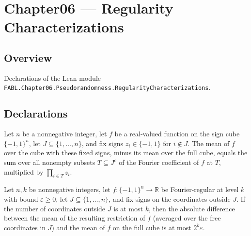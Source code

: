 \chapter{Chapter06 — Regularity Characterizations}
\section{Overview}

Declarations of the Lean module \texttt{FABL.Chapter06.Pseudorandomness.RegularityCharacterizations}.

\section{Declarations}

\begin{theorem}
\label{FABL.mean_signRestriction_sub_mean_eq_sum_nonempty}
\leanok
{}
Let $n$ be a nonnegative integer, let $f$ be a real-valued function on the sign cube
$\{−1,1\}^n$, let $J\subseteq\{1,\ldots,n\}$, and fix signs $z_i\in\{−1,1\}$ for
$i\notin J$. The mean of $f$ over the cube with these fixed signs, minus its mean over
the full cube, equals the sum over all nonempty subsets $T\subseteq J^c$ of the Fourier
coefficient of $f$ at $T$, multiplied by $\prod_{i\in T}z_i$.
\end{theorem}

\begin{theorem}
\label{FABL.IsLowDegreeFourierRegular.abs_mean_signRestriction_sub_mean_le}
\leanok
{}
Let $n,k$ be nonnegative integers, let $f:\{-1,1\}^n\to\mathbb R$ be Fourier-regular
at level $k$ with bound $\varepsilon\ge0$, let $J\subseteq\{1,\ldots,n\}$, and fix
signs on the coordinates outside $J$. If the number of coordinates outside $J$ is at
most $k$, then the absolute difference between the mean of the resulting restriction of
$f$ (averaged over the free coordinates in $J$) and the mean of $f$ on the full cube is
at most $2^k\varepsilon$.
\end{theorem}


